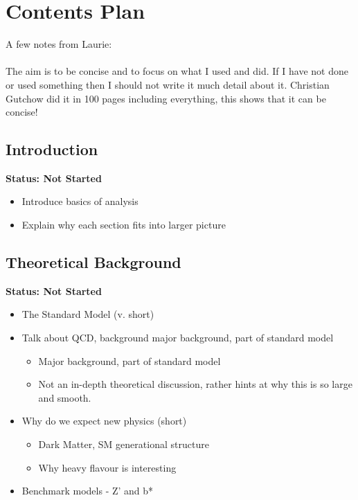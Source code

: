 %
%
%
\chapter{Contents Plan}

\noindent
A few notes from Laurie:\\
\indent\\
The aim is to be concise and to focus on what I used and did.
If I have not done or used something then I should not write it much detail about it.
Christian Gutchow did it in 100 pages including everything, this shows that it can be concise!

\section{Introduction}

\textbf{Status: Not Started}

\begin{itemize}
  \item{Introduce basics of analysis}
  \item{Explain why each section fits into larger picture}
\end{itemize}

\section{Theoretical Background}

\textbf{Status: Not Started}

\begin{itemize}
\item{The Standard Model (v. short)}
\item{Talk about QCD, background major background, part of standard model}
  \begin{itemize}[label={$-$}]
  \item{Major background, part of standard model}
  \item{Not an in-depth theoretical discussion, rather hints at why this is so large and smooth.}
  \end{itemize}     
\item{Why do we expect new physics (short)}
  \begin{itemize}[label={$-$}]
  \item{Dark Matter, SM generational structure}   
  \item{Why heavy flavour is interesting}
  \end{itemize}  
\item{Benchmark models - Z' and b*}
\end{itemize}

